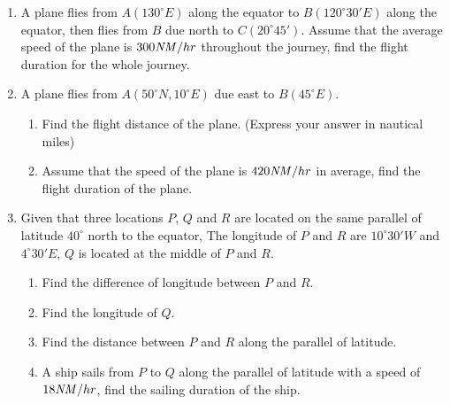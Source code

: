 \documentclass{report}
\begin{document}
\begin{multicols}{2}
\begin{enumerate}
        \item A plane flies from $A(130^\circ E)$ along the equator to $B(120^\circ 30' E)$
              along the equator, then flies from $B$ due north to $C(20^\circ 45')$. Assume
              that the average speed of the plane is $300\text{\emph{NM}}/hr$ throughout the
              journey, find the flight duration for the whole journey.
        \item A plane flies from $A(50^\circ N, 10^\circ E)$ due east to $B(45^\circ E)$.
              \begin{enumerate}
                  \item Find the flight distance of the plane. (Express your answer in nautical miles)
                  \item Assume that the speed of the plane is $420\text{\emph{NM}}/hr$ in average, find
                        the flight duration of the plane.
              \end{enumerate}
        \item Given that three locations $P$, $Q$ and $R$ are located on the same parallel of
              latitude $40^\circ$ north to the equator, The longitude of $P$ and $R$ are
              $10^\circ 30' W$ and $4^\circ 30' E$, $Q$ is located at the middle of $P$ and
              $R$.
              \begin{enumerate}
                  \item Find the difference of longitude between $P$ and $R$.
                  \item Find the longitude of $Q$.
                  \item Find the distance between $P$ and $R$ along the parallel of latitude.
                  \item A ship sails from $P$ to $Q$ along the parallel of latitude with a speed of
                        $18\text{\emph{NM}}/hr$, find the sailing duration of the ship.
              \end{enumerate}
    \end{enumerate}
\end{multicols}
\end{document}
